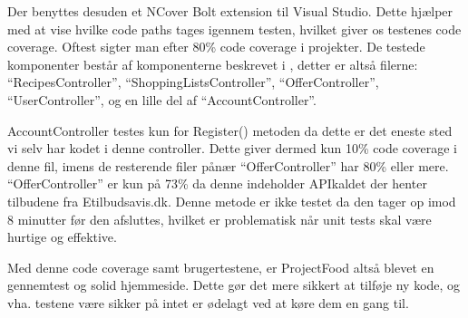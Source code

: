 Der benyttes desuden et NCover Bolt extension til Visual Studio. 
Dette hjælper med at vise hvilke code paths tages igennem testen, hvilket giver os testenes code coverage.
Oftest sigter man efter 80\% code coverage i projekter. \citep{Code_Coverage}
De testede komponenter består af komponenterne beskrevet i , detter er altså filerne: ``RecipesController'', ``ShoppingListsController'', ``OfferController'', ``UserController'',  og en lille del af ``AccountController''.

AccountController testes kun for Register() metoden da dette er det eneste sted vi selv har kodet i denne controller. Dette giver dermed kun 10\% code coverage i denne fil, imens de resterende filer pånær ``OfferController''  har 80\% eller mere.
``OfferController'' er kun på 73\% da denne indeholder APIkaldet der henter tilbudene fra Etilbudsavis.dk. 
Denne metode er ikke testet da den tager op imod 8 minutter før den afsluttes, hvilket er problematisk når unit tests skal være hurtige og effektive.

Med denne code coverage samt brugertestene, er ProjectFood altså blevet en gennemtest og solid hjemmeside.
Dette gør det mere sikkert at tilføje ny kode, og vha. testene være sikker på intet er ødelagt ved at køre dem en gang til.
